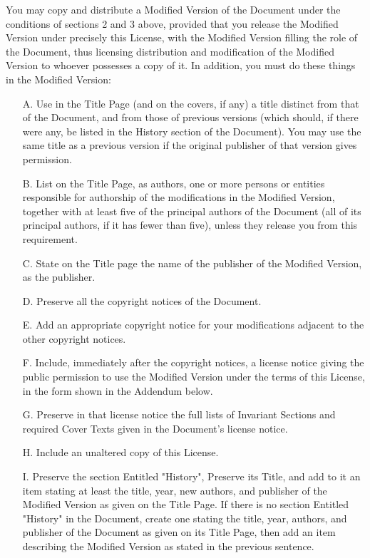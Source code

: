 You may copy and distribute a Modified Version of the Document under
the conditions of sections 2 and 3 above, provided that you release
the Modified Version under precisely this License, with the Modified
Version filling the role of the Document, thus licensing distribution
and modification of the Modified Version to whoever possesses a copy
of it.  In addition, you must do these things in the Modified Version:

\begin{itemize}
\item[A.] 
   Use in the Title Page (and on the covers, if any) a title distinct
   from that of the Document, and from those of previous versions
   (which should, if there were any, be listed in the History section
   of the Document).  You may use the same title as a previous version
   if the original publisher of that version gives permission.
   
\item[B.]
   List on the Title Page, as authors, one or more persons or entities
   responsible for authorship of the modifications in the Modified
   Version, together with at least five of the principal authors of the
   Document (all of its principal authors, if it has fewer than five),
   unless they release you from this requirement.
   
\item[C.]
   State on the Title page the name of the publisher of the
   Modified Version, as the publisher.
   
\item[D.]
   Preserve all the copyright notices of the Document.
   
\item[E.]
   Add an appropriate copyright notice for your modifications
   adjacent to the other copyright notices.
   
\item[F.]
   Include, immediately after the copyright notices, a license notice
   giving the public permission to use the Modified Version under the
   terms of this License, in the form shown in the Addendum below.
   
\item[G.]
   Preserve in that license notice the full lists of Invariant Sections
   and required Cover Texts given in the Document's license notice.
   
\item[H.]
   Include an unaltered copy of this License.
   
\item[I.]
   Preserve the section Entitled "History", Preserve its Title, and add
   to it an item stating at least the title, year, new authors, and
   publisher of the Modified Version as given on the Title Page.  If
   there is no section Entitled "History" in the Document, create one
   stating the title, year, authors, and publisher of the Document as
   given on its Title Page, then add an item describing the Modified
   Version as stated in the previous sentence.
   

\end{itemize}
